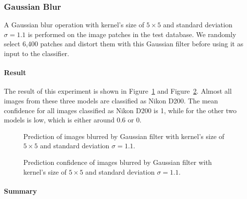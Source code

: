 \documentclass[a4paper, 9pt, twocolumn]{extarticle}
\begin{document}
\subsubsection{Gaussian Blur}
\label{section:blur}

A Gaussian blur operation with kernel's size of $ 5 \times 5 $ and standard deviation $ \sigma = 1.1 $ is performed on the image patches in the test database. We randomly select 6,400 patches and distort them with this Gaussian filter before using it as input to the classifier.

\paragraph{Result}
\label{section:blur result}

The result of this experiment is shown in Figure~\ref{fig:blur result} and Figure~\ref{fig:blur confidence}. Almost all images from these three models are classified as Nikon D200. The mean confidence for all images classified as Nikon D200 is 1, while for the other two models is low, which is either around 0.6 or 0.

\begin{figure}
	\centering
	\resizebox{!}{!}{
		{}
	}
	\caption{Prediction of images blurred by Gaussian filter with kernel's size of $ 5 \times 5 $ and standard deviation $ \sigma = 1.1 $.}
	\label{fig:blur result}
\end{figure}

\begin{figure}
	\centering
	\resizebox{!}{!}{
		{}
	}
	\caption{Prediction confidence of images blurred by Gaussian filter with kernel's size of $ 5 \times 5 $ and standard deviation $ \sigma = 1.1 $.}
	\label{fig:blur confidence}
\end{figure}

\paragraph{Summary}
\label{section:blur summary}
\end{document}
